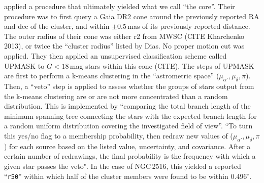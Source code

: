 \documentclass[12pt,twocolumn,tighten]{aastex63}
\newcommand{\cn}{NGC\,2516} %
\begin{document}
%
%
\citet{cantatgaudin_gaia_2018} applied a procedure that ultimately
yielded what we call ``the core''.  Their procedure was to first query
a Gaia DR2 cone around the previously reported RA and dec of the
cluster, and within $\pm 0.5$\,mas of its previously reported
distance. 
The outer radius of their cone was either r2 from MWSC (CITE
Kharchenko 2013), or twice the ``cluster radius'' listed by Dias.  No
proper motion cut was applied.  They then applied an unsupervised
classification scheme called UPMASK to $G<18$\,mag stars within this
cone (CITE).  The steps of UPMASK are first to perform a k-means
clustering in the ``astrometric space'' ($\mu_{\alpha'}, \mu_\delta,
\pi$).  Then, a ``veto'' step is applied to assess whether the groups
of stars output from the k-means clustering are or are not more
concentrated than a random distribution.  This is implemented by
``comparing the total branch length of the minimum spanning tree
connecting the stars with the expected branch length for a random
uniform distribution covering the investigated field of view''.  ``To
turn this yes/no flag to a membership probability,
\citet{cantatgaudin_gaia_2018} then redraw new values of
($\mu_{\alpha'}, \mu_\delta, \pi$) for each source based on the listed
value, uncertainty, and covariance.  After a certain number of
redrawings, the final probability is the frequency with which a given
star passes the veto".  In the case of \cn, this yielded a reported
``\texttt{r50}'' within which half of the cluster members were found
to be within 0.496$^\circ$.
\end{document}
